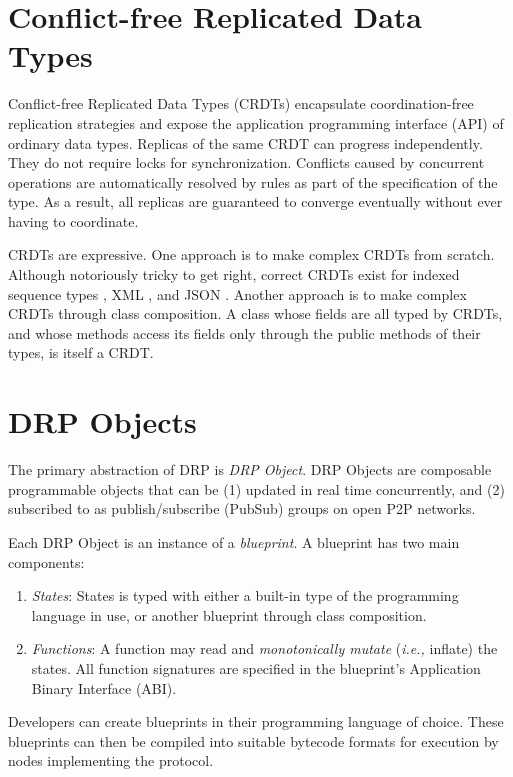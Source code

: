 \documentclass{article}
\begin{document}
\section{Conflict-free Replicated Data Types}
\label{sec:headings}

Conflict-free Replicated Data Types (CRDTs) encapsulate coordination-free replication strategies and expose the application programming interface (API) of ordinary data types. Replicas of the same CRDT can progress independently. They do not require locks for synchronization. Conflicts caused by concurrent operations are automatically resolved by rules as part of the specification of the type. As a result, all replicas are guaranteed to converge eventually without ever having to coordinate.

CRDTs are expressive. One approach is to make complex CRDTs from scratch. Although notoriously tricky to get right, correct CRDTs exist for indexed sequence types \cite{Lseq, RGA, YATA, Fugue}, XML \cite{XML-CRDT}, and JSON \cite{JSON-CRDT}. Another approach is to make complex CRDTs through class composition. A class whose fields are all typed by CRDTs, and whose methods access its fields only through the public methods of their types, is itself a CRDT.

\section{DRP Objects}
\label{sec:headings}

The primary abstraction of DRP is \textit{DRP Object}. DRP Objects are composable programmable objects that can be (1) updated in real time concurrently, and (2) subscribed to as publish/subscribe (PubSub) groups on open P2P networks.

Each DRP Object is an instance of a \textit{blueprint}. A blueprint has two main components:
\begin{enumerate}
    \item \textit{States}: States is typed with either a built-in type of the programming language in use, or another blueprint through class composition.
    \item \textit{Functions}: A function may read and \textit{monotonically mutate} (\textit{i.e.,} inflate) the states. All function signatures are specified in the blueprint's Application Binary Interface (ABI).
\end{enumerate}
Developers can create blueprints in their programming language of choice. These blueprints can then be compiled into suitable bytecode formats for execution by nodes implementing the protocol.
\end{document}
